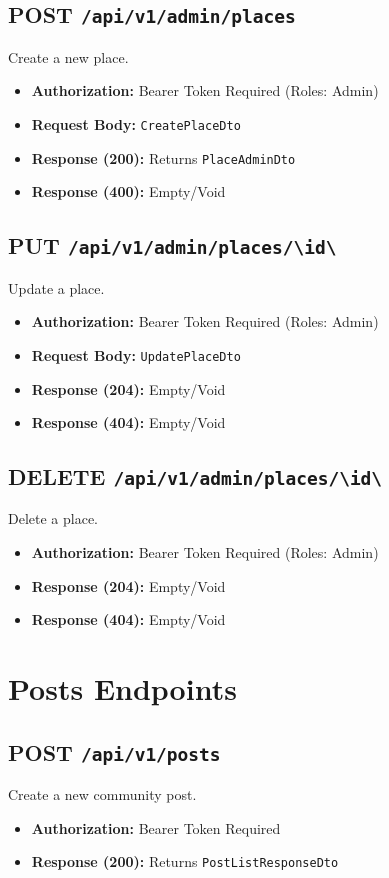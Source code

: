 \subsection{POST \texttt{/api/v1/admin/places}}
Create a new place.
\begin{itemize}
    \item \textbf{Authorization:} Bearer Token Required (Roles: Admin)
    \item \textbf{Request Body:} \texttt{CreatePlaceDto}
    \item \textbf{Response (200):} Returns \texttt{PlaceAdminDto}
    \item \textbf{Response (400):} Empty/Void
\end{itemize}

\subsection{PUT \texttt{/api/v1/admin/places/\textbackslash{}{id\textbackslash{}}}}
Update a place.
\begin{itemize}
    \item \textbf{Authorization:} Bearer Token Required (Roles: Admin)
    \item \textbf{Request Body:} \texttt{UpdatePlaceDto}
    \item \textbf{Response (204):} Empty/Void
    \item \textbf{Response (404):} Empty/Void
\end{itemize}

\subsection{DELETE \texttt{/api/v1/admin/places/\textbackslash{}{id\textbackslash{}}}}
Delete a place.
\begin{itemize}
    \item \textbf{Authorization:} Bearer Token Required (Roles: Admin)
    \item \textbf{Response (204):} Empty/Void
    \item \textbf{Response (404):} Empty/Void
\end{itemize}

\section{Posts Endpoints}

\subsection{POST \texttt{/api/v1/posts}}
Create a new community post.
\begin{itemize}
    \item \textbf{Authorization:} Bearer Token Required
    \item \textbf{Response (200):} Returns \texttt{PostListResponseDto}
\end{itemize}

